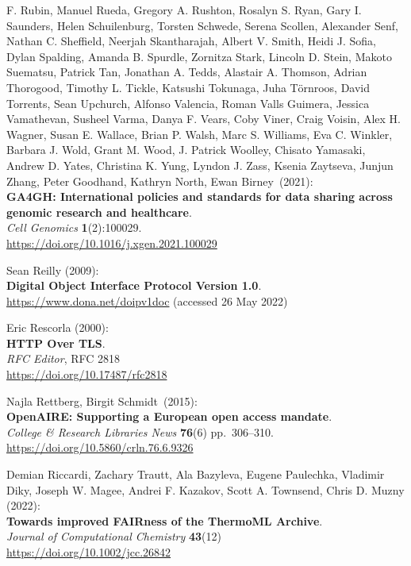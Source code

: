 \begin{thebibliography}{9}
F. Rubin, Manuel Rueda, Gregory A. Rushton, Rosalyn S. Ryan, Gary I.
Saunders, Helen Schuilenburg, Torsten Schwede, Serena Scollen, Alexander
Senf, Nathan C. Sheffield, Neerjah Skantharajah, Albert V. Smith, Heidi
J. Sofia, Dylan Spalding, Amanda B. Spurdle, Zornitza Stark, Lincoln D.
Stein, Makoto Suematsu, Patrick Tan, Jonathan A. Tedds, Alastair A.
Thomson, Adrian Thorogood, Timothy L. Tickle, Katsushi Tokunaga, Juha
Törnroos, David Torrents, Sean Upchurch, Alfonso Valencia, Roman Valls
Guimera, Jessica Vamathevan, Susheel Varma, Danya F. Vears, Coby Viner,
Craig Voisin, Alex H. Wagner, Susan E. Wallace, Brian P. Walsh, Marc S.
Williams, Eva C. Winkler, Barbara J. Wold, Grant M. Wood, J. Patrick
Woolley, Chisato Yamasaki, Andrew D. Yates, Christina K. Yung, Lyndon J.
Zass, Ksenia Zaytseva, Junjun Zhang, Peter Goodhand, Kathryn North, Ewan
Birney~(2021):\\
\textbf{GA4GH: International policies and standards for data sharing
across genomic research and healthcare}.\\
\emph{Cell Genomics} \textbf{1}(2):100029.\\
\url{https://doi.org/10.1016/j.xgen.2021.100029}


Sean Reilly (2009): \\
\textbf{Digital Object Interface Protocol Version 1.0}.\\
\url{https://www.dona.net/doipv1doc} (accessed 26 May 2022)

Eric Rescorla (2000):\\
\textbf{HTTP Over TLS}.\\
\emph{RFC Editor}, RFC 2818\\
\url{https://doi.org/10.17487/rfc2818}

Najla Rettberg, Birgit Schmidt~(2015):\\
\textbf{OpenAIRE: Supporting a European open access mandate}.\\
\emph{College \& Research Libraries News} \textbf{76}(6) pp.~306--310.\\
\url{https://doi.org/10.5860/crln.76.6.9326}

Demian Riccardi, Zachary Trautt, Ala Bazyleva, Eugene Paulechka, Vladimir Diky, Joseph W. Magee, Andrei F. Kazakov, Scott A. Townsend, Chris D. Muzny (2022):\\
\textbf{Towards improved {FAIRness} of the {ThermoML} Archive}.\\
\emph{Journal of Computational Chemistry} \textbf{43}(12)\\
\url{https://doi.org/10.1002/jcc.26842}



\end{thebibliography}
